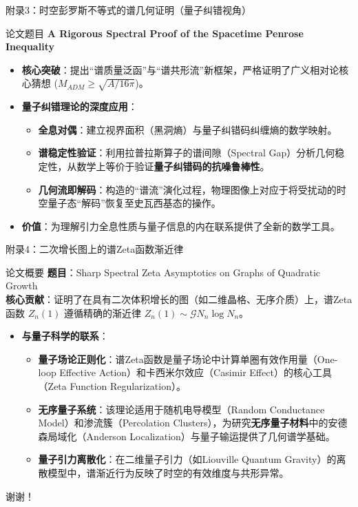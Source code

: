 \documentclass[aspectratio=169]{beamer} %
\begin{document}
\begin{frame}{附录3：时空彭罗斯不等式的谱几何证明（量子纠错视角）}
    \begin{block}{论文题目}
        \textbf{A Rigorous Spectral Proof of the Spacetime Penrose Inequality}
    \end{block}
    
    \begin{itemize}
        \item \textbf{核心突破}：提出“谱质量泛函”与“谱共形流”新框架，严格证明了广义相对论核心猜想 ($M_{ADM} \ge \sqrt{A/16\pi}$)。
        \item \textbf{量子纠错理论的深度应用}：
        \begin{itemize}
            \item \textbf{全息对偶}：建立视界面积（黑洞熵）与量子纠错码纠缠熵的数学映射。
            \item \textbf{谱稳定性验证}：利用拉普拉斯算子的谱间隙（Spectral Gap）分析几何稳定性，从数学上等价于验证\textbf{量子纠错码的抗噪鲁棒性}。
            \item \textbf{几何流即解码}：构造的“谱流”演化过程，物理图像上对应于将受扰动的时空量子态“解码”恢复至史瓦西基态的操作。
        \end{itemize}
        \item \textbf{价值}：为理解引力全息性质与量子信息的内在联系提供了全新的数学工具。
    \end{itemize}
\end{frame}

\begin{frame}{附录4：二次增长图上的谱Zeta函数渐近律}
    \begin{block}{论文概要}
        \textbf{题目}：Sharp Spectral Zeta Asymptotics on Graphs of Quadratic Growth \\
        \textbf{核心贡献}：证明了在具有二次体积增长的图（如二维晶格、无序介质）上，谱Zeta函数 $Z_n(1)$ 遵循精确的渐近律 $Z_n(1) \sim \mathcal{G} N_n \log N_n$。
    \end{block}
    \begin{itemize}
        \item \textbf{与量子科学的联系}：
        \begin{itemize}
            \item \textbf{量子场论正则化}：谱Zeta函数是量子场论中计算单圈有效作用量（One-loop Effective Action）和卡西米尔效应（Casimir Effect）的核心工具（Zeta Function Regularization）。
            \item \textbf{无序量子系统}：该理论适用于随机电导模型（Random Conductance Model）和渗流簇（Percolation Clusters），为研究\textbf{无序量子材料}中的安德森局域化（Anderson Localization）与量子输运提供了几何谱学基础。
            \item \textbf{量子引力离散化}：在二维量子引力（如Liouville Quantum Gravity）的离散模型中，谱渐近行为反映了时空的有效维度与共形异常。
        \end{itemize}
    \end{itemize}
\end{frame}

\begin{frame}
    \centering
    \Huge 谢谢！
\end{frame}
\end{document}
